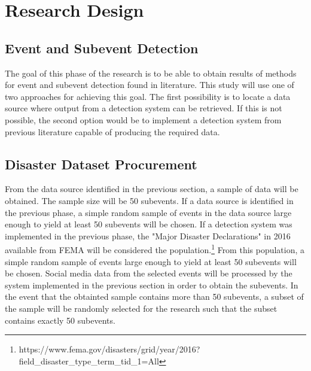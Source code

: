 \documentclass[conference]{IEEEtran}
\begin{document}

\section{Research Design}
\subsection {Event and Subevent Detection}
The goal of this phase of the research is to be able to obtain results of methods for event and subevent detection found in literature. This study will use one of two approaches for achieving this goal. The first possibility is to locate a data source where output from a detection system can be retrieved. If this is not possible, the second option would be to implement a detection system from previous literature capable of producing the required data.
\subsection{Disaster Dataset Procurement}
From the data source identified in the previous section, a sample of data will be obtained. The sample size will be 50 subevents. If a data source is identified in the previous phase, a simple random sample of events in the data source large enough to yield at least 50 subevents will be chosen. If a detection system was implemented in the previous phase, the "Major Disaster Declarations" in 2016 available from FEMA will be considered the population.\footnote{https://www.fema.gov/disasters/grid/year/2016?field\_disaster\_type\_term\_tid\_1=All} From this population, a simple random sample of events large enough to yield at least 50 subevents will be chosen. Social media data from the selected events will be processed by the system implemented in the previous section in order to obtain the subevents. In the event that the obtainted sample contains more than 50 subevents, a subset of the sample will be randomly selected for the research such that the subset contains exactly 50 subevents.
\end{document}
